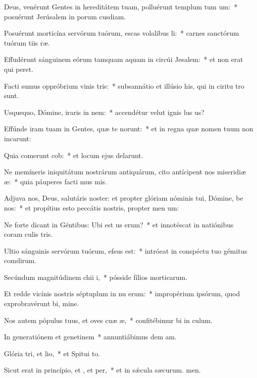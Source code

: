 \item Deus, venérunt Gentes in hereditátem tuam, polluérunt templum tum um:~* posuérunt Jerúsalem in porum cusdiam.
\item Posuérunt morticína servórum tuórum, escas volalibus li:~* carnes sanctórum tuórum tiis ræ.
\item Effudérunt sánguinem eórum tamquam aquam in circúi Jesalem:~* et non erat qui peret.
\item Facti sumus oppróbrium vinis tris:~* subsannátio et illúsio his, qui in ciritu tro sunt.
\item Usquequo, Dómine, iraris in nem:~* accendétur velut ignis lus us?
\item Effúnde iram tuam in Gentes, quæ te  norunt:~* et in regna quæ nomen tuum non incarunt:
\item Quia comerunt cob:~* et locum ejus delarunt.
\item Ne memíneris iniquitátum nostrárum antiquárum, cito antícipent nos miseridiæ æ:~* quia páuperes facti mus mis.
\item Adjuva nos, Deus, salutáris noster: et propter glóriam nóminis tui, Dómine, be nos:~* et propítius esto peccátis nostris, propter men um:
\item Ne forte dicant in Géntibus: Ubi est us erum?~* et innotéscat in natiónibus coram culis tris.
\item Ultio sánguinis servórum tuórum,  efsus est:~* intróeat in conspéctu tuo gémitus comdirum.
\item Secúndum magnitúdinem chii i,~* pósside fílios morticarum.
\item Et redde vicínis nostris séptuplum in nu erum:~* impropérium ipsórum, quod exprobravérunt bi, mine.
\item Nos autem pópulus tuus, et oves cuæ æ,~* confitébimur bi in culum.
\item In generatiónem et genetinem~* annuntiábimus dem am.
\item Glória tri, et lio,~* et Spitui to.
\item Sicut erat in princípio, et , et per,~* et in sǽcula sæcurum. men.
